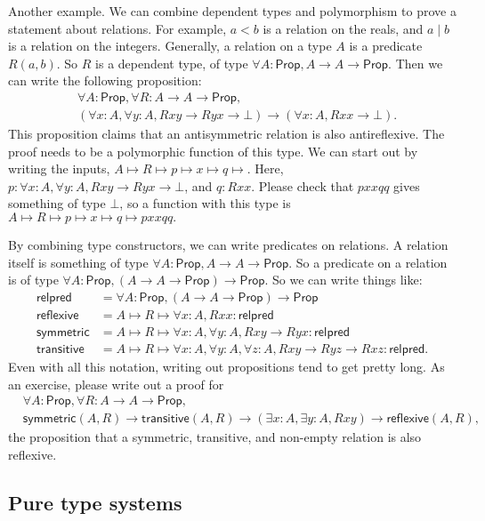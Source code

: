 \documentclass[11pt,paper=letter]{scrartcl}
\renewcommand{\sf}{\mathsf}
\newcommand{\false}{\bot}
\newcommand{\prop}{\mathsf{Prop}}
\begin{document}
Another example. We can combine dependent types and polymorphism to prove a statement about relations. For example, $a < b$ is a relation on the reals, and $a \mid b$ is a relation on the integers. Generally, a relation on a type $A$ is a predicate $R(a, b)$. So $R$ is a dependent type, of type $\forall A: \prop, A \to A \to \prop$. Then we can write the following proposition:
\begin{align*}
&\forall A: \prop, \forall R: A \to A \to \prop,\\
&(\forall x: A, \forall y: A, Rxy \to Ryx \to \false) \to (\forall x: A, Rxx \to \false).
\end{align*}
This proposition claims that an antisymmetric relation is also antireflexive. The proof needs to be a polymorphic function of this type. We can start out by writing the inputs, $A \mapsto R \mapsto p \mapsto x \mapsto q \mapsto$. Here, $p : \forall x: A, \forall y: A, Rxy \to Ryx \to \false$, and $q: Rxx$. Please check that $pxxqq$ gives something of type $\false$, so a function with this type is $A \mapsto R \mapsto p \mapsto x \mapsto q \mapsto pxxqq.$

By combining type constructors, we can write predicates on relations. A relation itself is something of type $\forall A: \prop, A \to A \to \prop$. So a predicate on a relation is of type $\forall A: \prop, (A \to A \to \prop) \to \prop$. So we can write things like:
\begin{align*}
\sf{relpred} &= \forall A: \prop, (A \to A \to \prop) \to \prop \\
\sf{reflexive} &= A \mapsto R \mapsto \forall x: A, Rxx: \sf{relpred} \\
\sf{symmetric} &= A \mapsto R \mapsto \forall x: A, \forall y: A, Rxy \to Ryx: \sf{relpred} \\
\sf{transitive} &= A \mapsto R \mapsto \forall x: A, \forall y: A, \forall z: A, Rxy \to Ryz \to Rxz: \sf{relpred}.
\end{align*}
Even with all this notation, writing out propositions tend to get pretty long. As an exercise, please write out a proof for
\begin{align*}
&\forall A: \prop, \forall R: A \to A \to \prop,\\
&\sf{symmetric}(A, R) \to \sf{transitive}(A, R) \to (\exists x: A, \exists y: A, Rxy) \to \sf{reflexive}(A, R),
\end{align*}
the proposition that a symmetric, transitive, and non-empty relation is also reflexive.

\subsection{Pure type systems}
\end{document}
